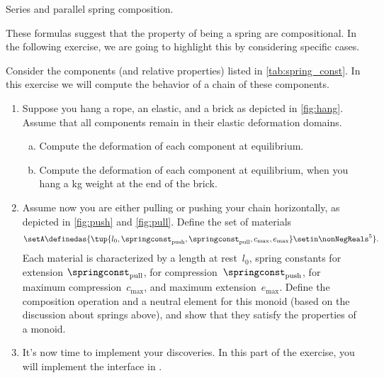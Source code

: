 \begin{marginfigure}
    \centering
    \hspace{1cm}
    \caption{Series and parallel spring composition.}
    \label{fig:springs}
\end{marginfigure}

These formulas suggest that the property of being a spring are compositional.
In the following exercise, we are going to highlight this by considering specific cases.

\begin{gradedexercise}
    \label{ex:Goldberg}
    Consider the components (and relative properties) listed in \cref{tab:spring_const}.
    In this exercise we will compute the behavior of a chain of these components.
    \begin{enumerate}
        \item Suppose you hang a rope, an elastic, and a brick as depicted in \cref{fig:hang}.
              Assume that all components remain in their elastic deformation domains.
              \begin{enumerate}[(a)]
                  \item Compute the deformation of each component at equilibrium.
                  \item Compute the deformation of each component at equilibrium, when you hang a \unit[1]{kg} weight at the end of the brick.
              \end{enumerate}
        \item Assume now you are either pulling or pushing your chain horizontally, as depicted in \cref{fig:push} and \cref{fig:pull}.
              Define the set of materials
              \begin{equation}
                  \setA\definedas \{ \tup{l_0, \springconst_\mathrm{push},\springconst_\mathrm{pull}, c_\mathrm{max}, e_\mathrm{max}} \setin \nonNegReals^5\}.
              \end{equation}
              Each material is characterized by a length at rest~$l_0$, spring constants for extension $\springconst_\mathrm{pull}$, for compression~$\springconst_\mathrm{push}$, for maximum compression~$c_\mathrm{max}$, and maximum extension~$e_\mathrm{max}$.
              Define the composition operation and a neutral element for this monoid (based on the discussion about springs above), and show that they satisfy the properties of a monoid.
        \item It's now time to implement your discoveries.
              In this part of the exercise, you will implement the interface in .


\end{enumerate}
\end{gradedexercise}

